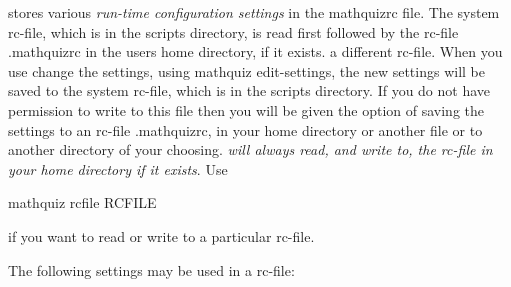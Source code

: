 \documentclass[svgnames]{article}
\newcommand\ddash{\texttt{\textemdash\textemdash}}
\newcommand\mathquizopt[1]{\textsf{mathquiz \ddash#1}}
\newcommand\mathquizrc{\index{mathquizrc}\textsf{mathquizrc}\xspace}
\begin{document}
    \MathQuiz stores various \textit{run-time configuration settings} in the \mathquizrc file. The
    system rc-file, which is in the \MathQuiz scripts directory, is read
    first  followed by the rc-file \textsf{.mathquizrc} in the users home
    directory, if it exists.  a different rc-file. When you use change
    the \MathQuiz settings, using \mathquizopt{edit-settings}, the new
    settings will be saved to the system rc-file, which is in the
    \MathQuiz scripts directory. If you do not have permission to write
    to this file then you will be given the option of saving the
    settings to an rc-file \textsf{.mathquizrc}, in your home directory
    or another file or to another directory of your choosing.
    \textit{\MathQuiz will always read, and write to, the rc-file in
    your home directory if it exists}.  Use
   \begin{center}
       \mathquizopt{rcfile RCFILE}
   \end{center}
   if you want \MathQuiz to read or write to a particular rc-file.

   The following settings may be used in a \MathQuiz rc-file:
\end{document}
